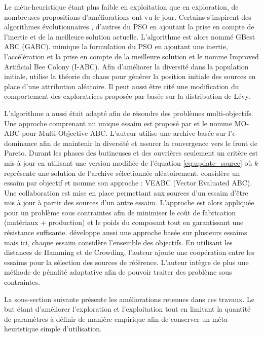 Le méta-heuristique étant plus faible en exploitation que en exploration, de nombreuses
propositions d’améliorations ont vu le jour.
Certains s’inspirent des algorithmes évolutionnaires \parencite{Bi2011174,Zhao2010558},
d’autres du PSO \parencite{Zhu20103166} en ajoutant la prise en compte de l’inertie
et de la meilleure solution actuelle. L’algorithme est alors nommé GBest ABC (GABC).
\cite{Li2012320} mimique la formulation du PSO en ajoutant une inertie, l’accélération et la prise
en compte de la meilleure solution et le nomme Improved Artificial Bee Colony (I-ABC).
Afin d’améliorer la diversité dans la population initiale, \cite{Xiang20131256}
utilise la théorie du chaos pour générer la position initiale des sources en place
d’une attribution aléatoire. Il peut aussi être cité une modification du comportement
des exploratrices proposée par \cite{Sharma2012213} basée sur la distribution de
Lévy.

L’algorithme a aussi était adapté afin de résoudre des problèmes multi-objectifs.
Une approche comprenant un unique essaim est proposé par \cite{Akbari201239}
et le nomme MO-ABC pour Multi-Objective ABC.
L’auteur utilise une archive basée sur l’$\epsilon$-dominance afin de maintenir
la diversité et assurer la convergence vers le front de Pareto. Durant les phases
des butineuses et des ouvrières seulement un critère est mis à jour en utilisant
une version modifiée de l’équation \eqref{eq:update_source} où $k$ représente une
solution de l’archive sélectionnée aléatoirement.
\cite{Omkar2011489} considère un essaim par objectif et nomme son approche : VEABC  (Vector Evaluated ABC).
Une collaboration est mise en place permettant aux sources d’un essaim d’être mis
à jour à partir des sources d’un autre essaim. L’approche est alors appliquée pour un
problème sous contraintes afin de minimiser le coût de fabrication (matériaux + production)
et le poids du composant tout en garantissant une résistance suffisante.
\cite{Zhang20121} développe aussi une approche basée sur plusieurs essaims mais ici,
chaque essaim considère l’ensemble des objectifs. En utilisant les distances de Hamming
et de Crowding, l’auteur ajoute une coopération entre les essaims pour la sélection
des sources de référence. L’auteur intègre de plus une méthode de pénalité adaptative
\parencite{Woldesenbet20073077} afin de pouvoir traiter des problème sous contraintes.

La sous-section suivante présente les améliorations retenues dans ces travaux.
Le but étant d’améliorer l’exploration et l’exploitation tout en limitant la
quantité de paramètres à définir de manière empirique afin de conserver un
méta-heuristique simple d’utilisation.



